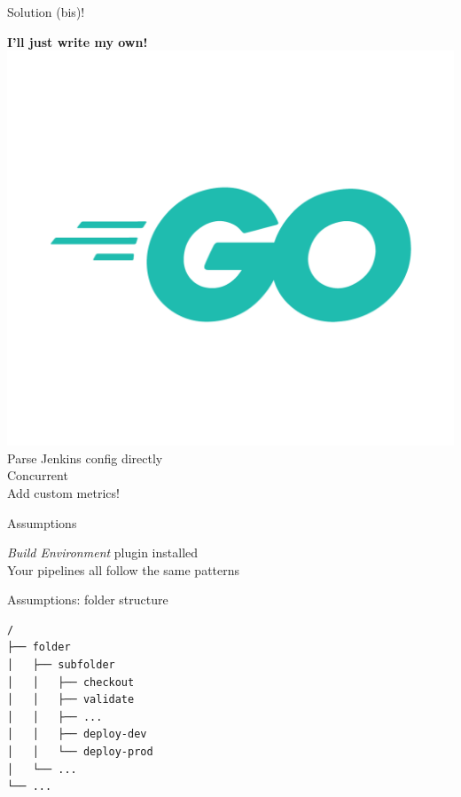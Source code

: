 \documentclass[aspectratio=169,12pt]{beamer}
\begin{document}
\begin{frame}[fragile]{Solution (bis)!}
  \begin{center}
    \Large\textbf{I'll just write my own!} \\ 
    \includegraphics[scale=0.3]{img/go.png}\\
    \normalsize Parse Jenkins config directly \\
    \vspace{10pt}
    Concurrent \\ 
    \vspace{10pt}
    Add custom metrics!
  \end{center}
\end{frame}

\begin{frame}[fragile]{Assumptions}
  \begin{center}
    \textit{Build Environment} plugin installed \\
    \vspace{20pt}
    Your pipelines all follow the same patterns
  \end{center}
\end{frame}

\begin{frame}[fragile]{Assumptions: folder structure}
  \begin{verbatim}
/
├── folder
│   ├── subfolder
│   │   ├── checkout
│   │   ├── validate
│   │   ├── ...
│   │   ├── deploy-dev
│   │   └── deploy-prod
│   └── ...
└── ...
  \end{verbatim}
\end{frame}
\end{document}
